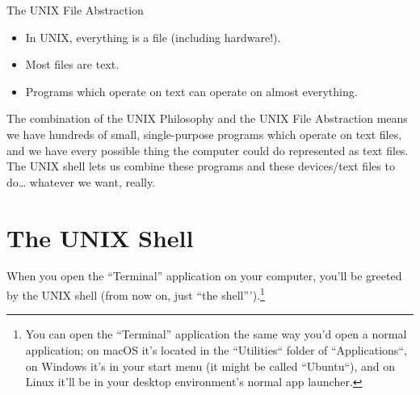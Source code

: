 \label{sec:unix_abstraction}
\begin{frame}{The UNIX File Abstraction}
  \begin{itemize}
    \item
      In UNIX, \alert<1>{everything is a file} (including hardware!).\pause
    \item
      Most files are text.\pause
    \item
      Programs which operate on text can operate on almost everything.
  \end{itemize}
\end{frame}

The combination of the UNIX Philosophy and the UNIX File Abstraction means we
have hundreds of small, single-purpose programs which operate on text files,
and we have every possible thing the computer could do represented as text
files.  The UNIX shell lets us combine these programs and these devices/text
files to do\ldots{} whatever we want, really.

\section{The UNIX Shell}

When you open the ``Terminal'' application on your computer, you'll be greeted
by the UNIX shell (from now on, just ``the shell''').\footnote{You can open the
\enquote{Terminal} application the same way you'd open a normal application; on
macOS it's located in the ``Utilities`` folder of ``Applications``, on Windows
it's in your start menu (it might be called ``Ubuntu``), and on Linux it'll be
in your desktop environment's normal app launcher.}


